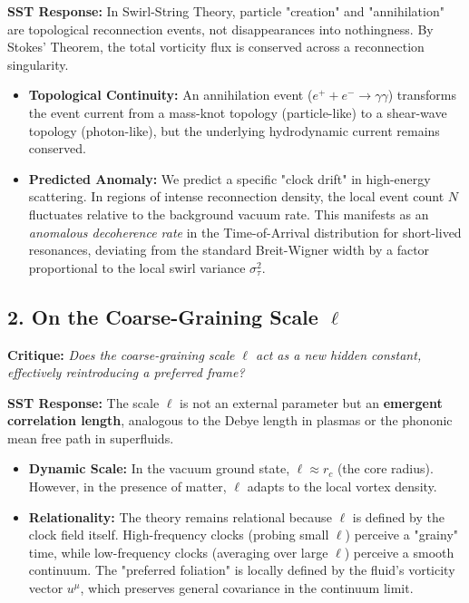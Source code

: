 \documentclass[10pt]{article}
\begin{document}
\noindent \textbf{SST Response:}
In Swirl-String Theory, particle "creation" and "annihilation" are topological reconnection events, not disappearances into nothingness. By Stokes' Theorem, the total vorticity flux is conserved across a reconnection singularity.
\begin{itemize}
    \item \textbf{Topological Continuity:} An annihilation event ($e^+ + e^- \to \gamma\gamma$) transforms the event current from a mass-knot topology (particle-like) to a shear-wave topology (photon-like), but the underlying hydrodynamic current remains conserved.
    \item \textbf{Predicted Anomaly:} We predict a specific "clock drift" in high-energy scattering. In regions of intense reconnection density, the local event count $N$ fluctuates relative to the background vacuum rate. This manifests as an \textit{anomalous decoherence rate} in the Time-of-Arrival distribution for short-lived resonances, deviating from the standard Breit-Wigner width by a factor proportional to the local swirl variance $\sigma_\tau^2$.
\end{itemize}

\subsection*{2. On the Coarse-Graining Scale $\ell$}
\noindent \textbf{Critique:} \textit{Does the coarse-graining scale $\ell$ act as a new hidden constant, effectively reintroducing a preferred frame?}

\noindent \textbf{SST Response:}
The scale $\ell$ is not an external parameter but an \textbf{emergent correlation length}, analogous to the Debye length in plasmas or the phononic mean free path in superfluids.
\begin{itemize}
    \item \textbf{Dynamic Scale:} In the vacuum ground state, $\ell \approx r_c$ (the core radius). However, in the presence of matter, $\ell$ adapts to the local vortex density.
    \item \textbf{Relationality:} The theory remains relational because $\ell$ is defined by the clock field itself. High-frequency clocks (probing small $\ell$) perceive a "grainy" time, while low-frequency clocks (averaging over large $\ell$) perceive a smooth continuum. The "preferred foliation" is locally defined by the fluid's vorticity vector $u^\mu$, which preserves general covariance in the continuum limit.
\end{itemize}
\end{document}

